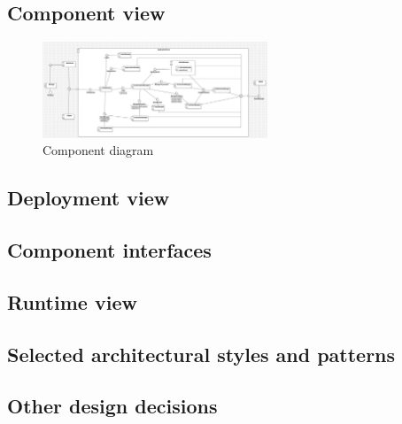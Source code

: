 \subsection{Component view}
\begin{figure}[H]
    \centering
    \includegraphics[angle=90,origin=c,width=0.6\textwidth]{Diagrams/ComponentDiagram.jpg}
    \caption{Component diagram}
    \label{fig:component_diagram}
\end{figure}
\subsection{Deployment view}
\subsection{Component interfaces}
\subsection{Runtime view}
\subsection{Selected architectural styles and patterns}
\subsection{Other design decisions}
